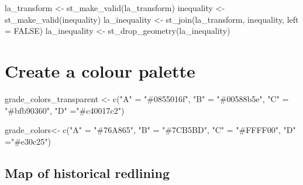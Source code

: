 \documentclass[
  letterpaper,
  DIV=11,
  numbers=noendperiod]{scrartcl}
\newenvironment{Shaded}{\begin{snugshade}}{\end{snugshade}}
\newcommand{\AttributeTok}[1]{\textcolor[rgb]{0.40,0.45,0.13}{#1}}
\newcommand{\ConstantTok}[1]{\textcolor[rgb]{0.56,0.35,0.01}{#1}}
\newcommand{\FunctionTok}[1]{\textcolor[rgb]{0.28,0.35,0.67}{#1}}
\newcommand{\NormalTok}[1]{\textcolor[rgb]{0.00,0.23,0.31}{#1}}
\newcommand{\OtherTok}[1]{\textcolor[rgb]{0.00,0.23,0.31}{#1}}
\newcommand{\StringTok}[1]{\textcolor[rgb]{0.13,0.47,0.30}{#1}}
\begin{document}
\begin{Shaded}
\begin{Highlighting}[]
\NormalTok{la\_transform }\OtherTok{\textless{}{-}} \FunctionTok{st\_make\_valid}\NormalTok{(la\_transform)}
\NormalTok{inequality }\OtherTok{\textless{}{-}} \FunctionTok{st\_make\_valid}\NormalTok{(inequality)}
\NormalTok{la\_inequality }\OtherTok{\textless{}{-}} \FunctionTok{st\_join}\NormalTok{(la\_transform, inequality, }\AttributeTok{left =} \ConstantTok{FALSE}\NormalTok{)}
\NormalTok{la\_inequality }\OtherTok{\textless{}{-}} \FunctionTok{st\_drop\_geometry}\NormalTok{(la\_inequality)}
\end{Highlighting}
\end{Shaded}

\section{Create a colour palette}\label{create-a-colour-palette}

\begin{Shaded}
\begin{Highlighting}[]
\NormalTok{grade\_colors\_transparent }\OtherTok{\textless{}{-}} \FunctionTok{c}\NormalTok{(}\StringTok{"A"} \OtherTok{=} \StringTok{"\#0855016f"}\NormalTok{, }\StringTok{"B"} \OtherTok{=} \StringTok{"\#00588b5e"}\NormalTok{, }\StringTok{"C"} \OtherTok{=} \StringTok{"\#bfb90360"}\NormalTok{, }\StringTok{"D"} \OtherTok{=}\StringTok{"\#c40017c2"}\NormalTok{)}

\NormalTok{grade\_colors}\OtherTok{\textless{}{-}} \FunctionTok{c}\NormalTok{(}\StringTok{"A"} \OtherTok{=} \StringTok{"\#76A865"}\NormalTok{, }\StringTok{"B"} \OtherTok{=} \StringTok{"\#7CB5BD"}\NormalTok{, }\StringTok{"C"} \OtherTok{=} \StringTok{"\#FFFF00"}\NormalTok{, }\StringTok{"D"} \OtherTok{=}\StringTok{"\#e30c25"}\NormalTok{)}
\end{Highlighting}
\end{Shaded}

\subsection{Map of historical
redlining}\label{map-of-historical-redlining}
\end{document}

